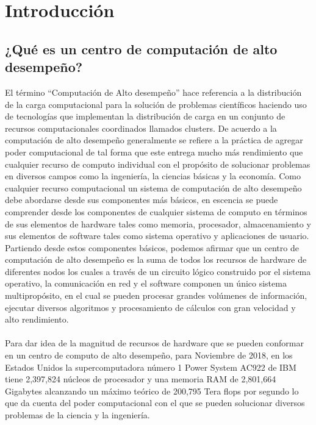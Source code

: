 \chapter{Introducción}
\section{¿Qué es un centro de computación de alto desempeño?}

El término ``Computación de Alto desempeño'' hace referencia a la distribución de la carga computacional para la solución de problemas científicos haciendo uso de tecnologías que implementan la distribución de carga en un conjunto de recursos computacionales coordinados llamados clusters. De acuerdo a \cite{insidehpc} la computación de alto desempeño generalmente se refiere a la práctica de agregar poder computacional de tal forma que este entrega mucho más rendimiento que cualquier recurso de computo individual con el propósito de solucionar problemas en diversos campos como la ingeniería, la ciencias básicas y la economía.
\newline
\newline
Como cualquier recurso computacional un sistema de computación de alto desempeño debe abordarse desde sus componentes más básicos, en escencia se puede comprender desde los componentes de cualquier sistema de computo en términos de sus elementos de hardware tales como memoria, procesador, almacenamiento y sus elementos de software tales como sistema operativo y aplicaciones de usuario.
Partiendo desde estos componentes básicos, podemos afirmar que un centro de computación de alto desempeño es la suma de todos los recursos de hardware de diferentes nodos los cuales a través de un circuito lógico construido por el sistema operativo, la comunicación en red y el software componen un único sistema multipropósito, en el cual se pueden procesar grandes volúmenes de información, ejecutar diversos algoritmos y procesamiento de cálculos con gran velocidad y alto rendimiento.
\\\\
Para dar idea de la magnitud de recursos de hardware que se pueden conformar en un centro de computo de alto desempeño, para Noviembre de 2018, en los Estados Unidos la supercomputadora número 1 Power System AC922 de IBM tiene 2,397,824 núcleos de procesador y una memoria RAM de 2,801,664 Gigabytes alcanzando un máximo teórico de 200,795 Tera flops por segundo \cite{top500_supercomputer_sites_2019} lo que da cuenta del poder computacional con el que se pueden solucionar diversos problemas de la ciencia y la ingeniería.

